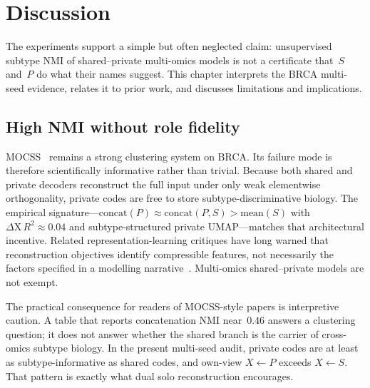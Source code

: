 \clearpage
\section{Discussion}
\label{sec:discussion}

The experiments support a simple but often neglected claim: unsupervised subtype NMI of shared--private multi-omics models is not a certificate that~$S$ and~$P$ do what their names suggest. This chapter interprets the BRCA multi-seed evidence, relates it to prior work, and discusses limitations and implications.

\subsection{High NMI without role fidelity}

MOCSS~\citep{chen2023mocss} remains a strong clustering system on BRCA. Its failure mode is therefore scientifically informative rather than trivial. Because both shared and private decoders reconstruct the full input under only weak elementwise orthogonality, private codes are free to store subtype-discriminative biology. The empirical signature---$\mathrm{concat}(P)\approx\mathrm{concat}(P,S)>\mathrm{mean}(S)$ with $\Delta\mathrm{X}\,R^{2}\approx0.04$ and subtype-structured private UMAP---matches that architectural incentive. Related representation-learning critiques have long warned that reconstruction objectives identify compressible features, not necessarily the factors specified in a modelling narrative~\citep{bengio2013representation,martens2024disentangling}. Multi-omics shared--private models are not exempt.

The practical consequence for readers of MOCSS-style papers is interpretive caution. A table that reports concatenation NMI near~$0.46$ answers a clustering question; it does not answer whether the shared branch is the carrier of cross-omics subtype biology. In the present multi-seed audit, private codes are at least as subtype-informative as shared codes, and own-view $X\leftarrow P$ exceeds $X\leftarrow S$. That pattern is exactly what dual solo reconstruction encourages.

